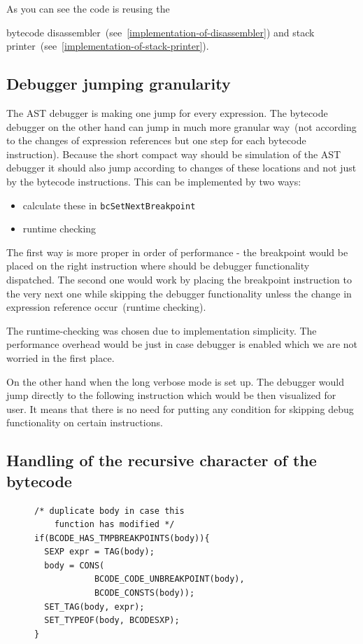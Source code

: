 \documentclass[thesis=M,english]{FITthesis}[2018/10/20]
\newcommand{\code}[1]{\texttt{#1}}
\begin{document}
As you can see the code is reusing the {bytecode disassembler~(see~\ref{implementation-of-disassembler}) and stack printer~(see~\ref{implementation-of-stack-printer}).

\subsection{Debugger jumping granularity}\label{debugger-jumping-granuality}

The AST debugger is making one jump for every expression. The bytecode debugger on the other hand can jump in much more granular way~(not according to the changes of expression references but one step for each bytecode instruction). Because the short compact way should be simulation of the AST debugger it should also jump according to changes of these locations and not just by the bytecode instructions. This can be implemented by two ways:

\begin{itemize}
	\item calculate these in \code{bcSetNextBreakpoint}
	\item runtime checking
\end{itemize}

The first way is more proper in order of performance - the breakpoint would be placed on the right instruction where should be debugger functionality dispatched. The second one would work by placing the breakpoint instruction to the very next one while skipping the debugger functionality unless the change in expression reference occur~(runtime checking).

The runtime-checking was chosen due to implementation simplicity. The performance overhead would be just in case debugger is enabled which we are not worried in the first place.

On the other hand when the long verbose mode is set up. The debugger would jump directly to the following instruction which would be then visualized for user. It means that there is no need for putting any condition for skipping debug functionality on certain instructions.

\subsection{Handling of the recursive character of the bytecode}

\begin{figure}[h]
\begin{lstlisting}
/* duplicate body in case this
	function has modified */
if(BCODE_HAS_TMPBREAKPOINTS(body)){
  SEXP expr = TAG(body);
  body = CONS(
            BCODE_CODE_UNBREAKPOINT(body),
            BCODE_CONSTS(body));
  SET_TAG(body, expr);
  SET_TYPEOF(body, BCODESXP);
}


\end{lstlisting}
\end{figure}}
\end{document}
